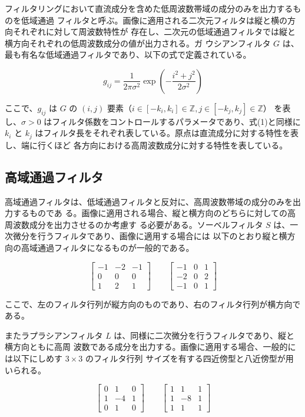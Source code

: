 \documentclass[dvipdfmx]{jsarticle}
\begin{document}
フィルタリングにおいて直流成分を含めた低周波数帯域の成分のみを出力するものを低域通過
フィルタと呼ぶ。画像に適用される二次元フィルタは縦と横の方向それぞれに対して周波数特性が
存在し、二次元の低域通過フィルタでは縦と横方向それぞれの低周波数成分の値が出力される。ガ
ウシアンフィルタ $G$ は、最も有名な低域通過フィルタであり、以下の式で定義されている。

\begin{equation}
g_{ij}
=
\frac{1}{2\pi\sigma^2}
\exp
\left(
-\frac{i^2+j^2}{2\sigma^2}
\right)
\tag{9}
\end{equation}

ここで、$g_{ij}$ は $G$ の $(i,j)$ 要素（$i\in[-k_i,k_i]\in\mathbb{Z},j\in[-k_j,k_j]\in\mathbb{Z}$）
を表し、$\sigma>0$ はフィルタ係数をコントロールするパラメータであり、式(1)と同様に $k_i$
と $k_j$ はフィルタ長をそれぞれ表している。原点は直流成分に対する特性を表し、端に行くほど
各方向における高周波数成分に対する特性を表している。


\subsection{高域通過フィルタ}

高域通過フィルタは、低域通過フィルタと反対に、高周波数帯域の成分のみを出力するものであ
る。画像に適用される場合、縦と横方向のどちらに対しての高周波数成分を出力させるのか考慮す
る必要がある。ソーベルフィルタ $S$ は、一次微分を行うフィルタであり、画像に適用する場合には
以下のとおり縦と横方向の高域通過フィルタになるものが一般的である。

\[
\begin{bmatrix}
-1 & -2 & -1 \\
0 & 0 & 0 \\
1 & 2 & 1
\end{bmatrix}
\qquad
\begin{bmatrix}
-1 & 0 & 1 \\
-2 & 0 & 2 \\
-1 & 0 & 1
\end{bmatrix}
\]

ここで、左のフィルタ行列が縦方向のものであり、右のフィルタ行列が横方向である。

またラプラシアンフィルタ $L$ は、同様に二次微分を行うフィルタであり、縦と横方向ともに高周
波数である成分を出力する。画像に適用する場合、一般的には以下にしめす $3\times3$ のフィルタ行列
サイズを有する四近傍型と八近傍型が用いられる。

\[
\begin{bmatrix}
0 & 1 & 0 \\
1 & -4 & 1 \\
0 & 1 & 0
\end{bmatrix}
\qquad
\begin{bmatrix}
1 & 1 & 1 \\
1 & -8 & 1 \\
1 & 1 & 1
\end{bmatrix}
\]
\end{document}
